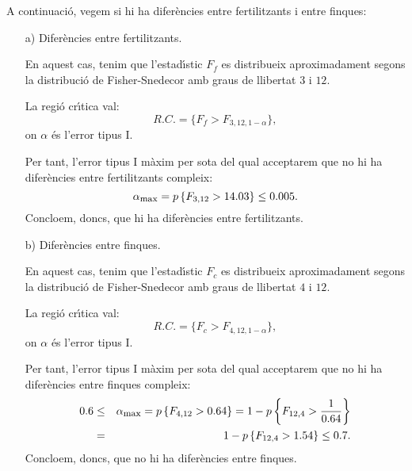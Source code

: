 {A continuaci\'o, vegem si hi ha difer\`encies entre fertilitzants i entre 
finques:
\begin{itemize}
	\item[a)] Difer\`encies entre fertilitzants.
	
	En aquest cas, tenim que l'estad\'{\i}stic $F_f$ es distribueix 
	aproximadament segons la distribuci\'o 
	de Fisher-Snedecor amb graus de 
	llibertat $3$ i $12$. 
	
	La regi\'o cr\'{\i}tica val:
	\[
	R.C.=\{F_f > F_{3,12,1-\alpha}\},
	\]
	on $\alpha$ \'es l'error tipus I.
	
	Per tant, l'error tipus I m\`axim per sota del qual acceptarem que no hi 
	ha difer\`encies entre fertilitzants compleix:
	\[
	\alpha_{\mbox{\footnotesize max}}=p\left\{F_{3,12}> 14.03\right\}\leq 0.005.
	\]
	Concloem, doncs, que hi ha difer\`encies entre fertilitzants.
	\item[b)] Difer\`encies entre finques.
	
	En aquest cas, tenim que l'estad\'{\i}stic $F_c$ es distribueix 
	aproximadament segons la distribuci\'o de 
	Fisher-Snedecor amb graus de 
	llibertat $4$ i $12$. 
	
	La regi\'o cr\'{\i}tica val:
	\[
	R.C.=\{F_c > F_{4,12,1-\alpha}\},
	\]
	on $\alpha$ \'es l'error tipus I.
	
	Per tant, l'error tipus I m\`axim per sota del qual acceptarem que no hi 
	ha difer\`encies entre finques compleix:
	\begin{eqnarray*}
	0.6 &\leq & \alpha_{\mbox{\footnotesize max}}=p\left\{F_{4,12}> 
	0.64\right\}=1-p\left\{F_{12,4}>\frac{1}{0.64}\right\}\\ &=& 
	1-p\left\{F_{12,4}>1.54\right\}\leq 0.7.
	\end{eqnarray*}
	Concloem, doncs, que no hi ha difer\`encies entre finques.
\end{itemize}
}

\newpage

